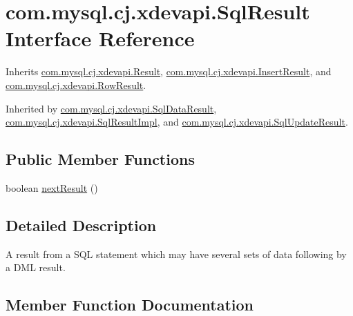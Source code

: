\hypertarget{interfacecom_1_1mysql_1_1cj_1_1xdevapi_1_1_sql_result}{}\section{com.\+mysql.\+cj.\+xdevapi.\+Sql\+Result Interface Reference}
\label{interfacecom_1_1mysql_1_1cj_1_1xdevapi_1_1_sql_result}


Inherits \mbox{\hyperlink{interfacecom_1_1mysql_1_1cj_1_1xdevapi_1_1_result}{com.\+mysql.\+cj.\+xdevapi.\+Result}}, \mbox{\hyperlink{interfacecom_1_1mysql_1_1cj_1_1xdevapi_1_1_insert_result}{com.\+mysql.\+cj.\+xdevapi.\+Insert\+Result}}, and \mbox{\hyperlink{interfacecom_1_1mysql_1_1cj_1_1xdevapi_1_1_row_result}{com.\+mysql.\+cj.\+xdevapi.\+Row\+Result}}.



Inherited by \mbox{\hyperlink{classcom_1_1mysql_1_1cj_1_1xdevapi_1_1_sql_data_result}{com.\+mysql.\+cj.\+xdevapi.\+Sql\+Data\+Result}}, \mbox{\hyperlink{classcom_1_1mysql_1_1cj_1_1xdevapi_1_1_sql_result_impl}{com.\+mysql.\+cj.\+xdevapi.\+Sql\+Result\+Impl}}, and \mbox{\hyperlink{classcom_1_1mysql_1_1cj_1_1xdevapi_1_1_sql_update_result}{com.\+mysql.\+cj.\+xdevapi.\+Sql\+Update\+Result}}.

\subsection*{Public Member Functions}
\begin{DoxyCompactItemize}
\item 
boolean \mbox{\hyperlink{interfacecom_1_1mysql_1_1cj_1_1xdevapi_1_1_sql_result_ad5c821bd2efe2e952aef48dc574e913d}{next\+Result}} ()
\end{DoxyCompactItemize}


\subsection{Detailed Description}
A result from a S\+QL statement which may have several sets of data following by a D\+ML result. 

\subsection{Member Function Documentation}
\mbox{\label{interfacecom_1_1mysql_1_1cj_1_1xdevapi_1_1_sql_result_ad5c821bd2efe2e952aef48dc574e913d}} 
